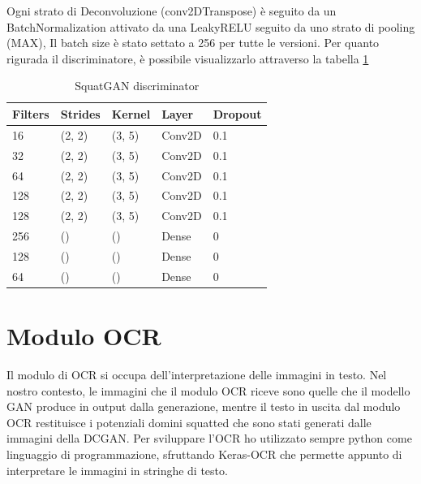 Ogni strato di Deconvoluzione (conv2DTranspose) è seguito da un BatchNormalization attivato da una LeakyRELU seguito da uno strato di pooling (MAX), Il batch size è stato settato a 256 per tutte le versioni. Per quanto rigurada il discriminatore, è possibile visualizzarlo attraverso la tabella \ref{table:discriminator}
\begin{table}[!h]
    \centering
    \begin{tabular}{|l|l|l|l|l|}
    \hline
    Filters & Strides & Kernel & Layer  & Dropout \\ \hline
    16      & (2, 2)  & (3, 5) & Conv2D & 0.1     \\
    32      & (2, 2)  & (3, 5) & Conv2D & 0.1     \\
    64      & (2, 2)  & (3, 5) & Conv2D & 0.1     \\
    128     & (2, 2)  & (3, 5) & Conv2D & 0.1     \\
    128     & (2, 2)  & (3, 5) & Conv2D & 0.1     \\
    256     & ()      & ()     & Dense  & 0       \\
    128     & ()      & ()     & Dense  & 0       \\
    64      & ()      & ()     & Dense  & 0       \\
    \hline
    \end{tabular}
    \caption{SquatGAN discriminator}
    \label{table:discriminator}
\end{table}


\section{Modulo OCR}
Il modulo di OCR si occupa dell'interpretazione delle immagini in testo. Nel nostro contesto, le immagini che il modulo OCR riceve sono quelle che il modello GAN produce in output dalla generazione, mentre il testo in uscita dal modulo OCR restituisce i potenziali domini squatted che sono stati generati dalle immagini della DCGAN.
Per sviluppare l'OCR ho utilizzato sempre python come linguaggio di programmazione, sfruttando Keras-OCR che permette appunto di interpretare le immagini in stringhe di testo.